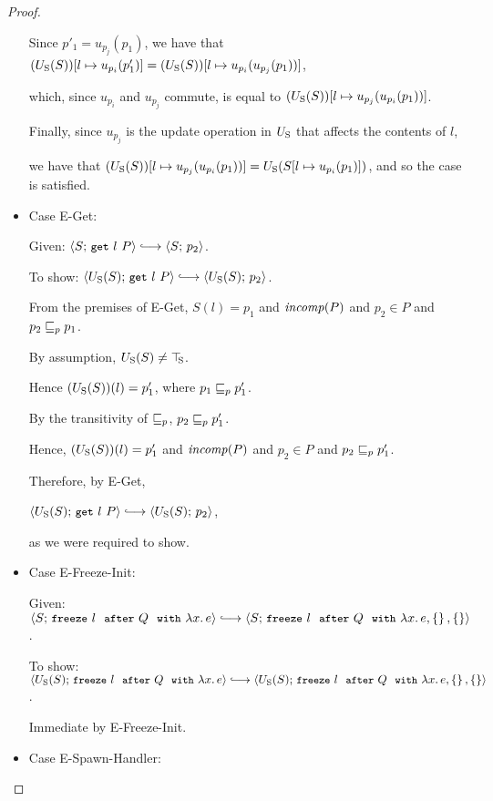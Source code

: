 \begin{proof}
\begin{itemize}
    Since $p'_1 = u_{p_j}(p_1)$, we have that
    $(U_{\mathrm{S}}(S))[l \mapsto u_{p_i}(p'_1)] =
    (U_{\mathrm{S}}(S))[l \mapsto u_{p_i}(u_{p_j}(p_1))]$,

    which, since $u_{p_i}$ and $u_{p_j}$ commute, is equal to
    $(U_{\mathrm{S}}(S))[l \mapsto u_{p_j}(u_{p_i}(p_1))]$.

    Finally, since $u_{p_j}$ is the update operation in $U_{\mathrm{S}}$ that
    affects the contents of $l$,

    we have that $(U_{\mathrm{S}}(S))[l \mapsto u_{p_j}(u_{p_i}(p_1))] =
    U_{\mathrm{S}}(S[l \mapsto u_{p_i}(p_1)])$, and so the case is satisfied.

  \item Case {\sc E-Get}:

    Given: $\config{S}{\getexp{l}{P}} \parstepsto \config{S}{p_2}$.

    To show: $\config{\Ustore(S)}{\getexp{l}{P}} \parstepsto
    \config{\Ustore(S)}{p_2}$.

    From the premises of {\sc E-Get}, $S(l) = p_1$ and $\mathit{incomp}(P)$
    and $p_2 \in P$ and $p_2 \sqsubseteq_p p_1$.

    By assumption, $U_{\mathrm{S}}(S) \neq \top\hspace{-0.85mm}_{\mathrm{S}}$.

    Hence $(U_{\mathrm{S}}(S))(l) = p'_1$, where $p_1 \sqsubseteq_p p'_1$.

    By the transitivity of $\sqsubseteq_p$, $p_2 \sqsubseteq_p p'_1$.

    Hence, $(U_{\mathrm{S}}(S))(l) = p'_1$ and $\mathit{incomp}(P)$ and $p_2 \in P$ and
    $p_2 \sqsubseteq_p p'_1$.

    Therefore, by {\sc E-Get},

    $\config{\Ustore(S)}{\getexp{l}{P}} \parstepsto \config{\Ustore(S)}{p_2}$,

    as we were required to show.

  \item Case {\sc E-Freeze-Init}:

    Given: $\config{S}{\freezeafter{l}{Q}{\lam{x}{e}}} \parstepsto
    \\ \config{S}{\freezeafterfull{l}{Q}{\lam{x}{e}}{\setof{}}{\setof{}}}$.

    To show: $\config{\Ustore(S)}{\freezeafter{l}{Q}{\lam{x}{e}}}
    \parstepsto
    \\ \config{\Ustore(S)}{\freezeafterfull{l}{Q}{\lam{x}{e}}{\setof{}}{\setof{}}}$.

    Immediate by {\sc E-Freeze-Init}.

  \item Case {\sc E-Spawn-Handler}:


\end{itemize}
\end{proof}
